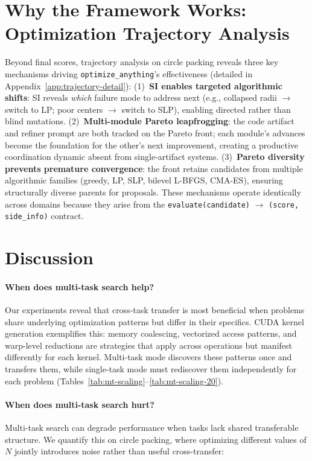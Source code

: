 \documentclass[sigconf]{acmart}
\newcommand{\oa}{\texttt{optimize\_anything}}
\begin{document}
\section{Why the Framework Works: Optimization Trajectory Analysis}\label{sec:trajectory}

Beyond final scores, trajectory analysis on circle packing reveals three key mechanisms driving \oa{}'s effectiveness (detailed in Appendix~\ref{app:trajectory-detail}):
(1)~\textbf{SI enables targeted algorithmic shifts}: SI reveals \emph{which} failure mode to address next (e.g., collapsed radii $\to$ switch to LP; poor centers $\to$ switch to SLP), enabling directed rather than blind mutations.
(2)~\textbf{Multi-module Pareto leapfrogging}: the code artifact and refiner prompt are both tracked on the Pareto front; each module's advances become the foundation for the other's next improvement, creating a productive coordination dynamic absent from single-artifact systems.
(3)~\textbf{Pareto diversity prevents premature convergence}: the front retains candidates from multiple algorithmic families (greedy, LP, SLP, bilevel L-BFGS, CMA-ES), ensuring structurally diverse parents for proposals.
These mechanisms operate identically across domains because they arise from the \texttt{evaluate(candidate)} $\to$ \texttt{(score, side\_info)} contract.

\section{Discussion}\label{sec:discussion}

\paragraph{When does multi-task search help?}
Our experiments reveal that cross-task transfer is most beneficial when problems share underlying optimization patterns but differ in their specifics. CUDA kernel generation exemplifies this: memory coalescing, vectorized access patterns, and warp-level reductions are strategies that apply across operations but manifest differently for each kernel. Multi-task mode discovers these patterns once and transfers them, while single-task mode must rediscover them independently for each problem (Tables~\ref{tab:mt-scaling}--\ref{tab:mt-scaling-20}).

\paragraph{When does multi-task search hurt?}
Multi-task search can degrade performance when tasks lack shared transferable structure. We quantify this on circle packing, where optimizing different values of $N$ jointly introduces noise rather than useful cross-transfer:
\end{document}
